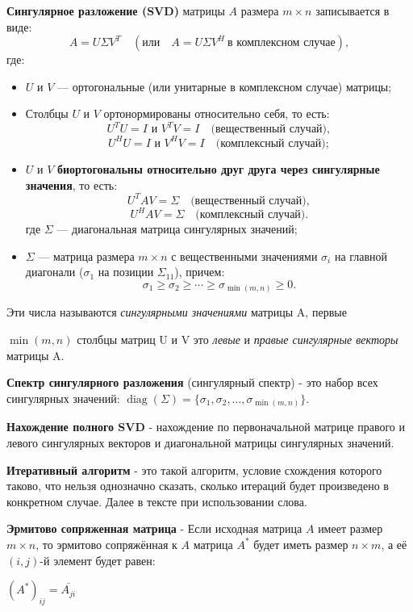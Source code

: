\hspace{0.45cm} \textbf{Сингулярное разложение (SVD)} матрицы \( A \) размера \( m \times n \) записывается в виде:
\[
A = U \Sigma V^T \quad (\text{или} \quad A = U \Sigma V^H \ \text{в комплексном случае}),
\]
где:
\begin{itemize}
    \item \( U \) и \( V \) — ортогональные (или унитарные в комплексном случае) матрицы;
    \item Столбцы \( U \) и \( V \) ортонормированы относительно себя, то есть:
    \[
    U^T U = I \text{ и } V^T V = I \quad \text{(вещественный случай)},
    \]
    \[
    U^H U = I \text{ и } V^H V = I \quad \text{(комплексный случай)};
    \]
    \item \( U \) и \( V \) \textbf{биортогональны относительно друг друга через сингулярные значения}, то есть:
    \[
    U^T A V = \Sigma \quad \text{(вещественный случай)},
    \]
    \[
    U^H A V = \Sigma \quad \text{(комплексный случай)}.
    \]
    где \( \Sigma \) — диагональная матрица сингулярных значений;
    \item \( \Sigma \) — матрица размера \( m \times n \) с вещественными значениями \( \sigma_i \) на главной диагонали (\( \sigma_1 \) на позиции \( \Sigma_{11} \)), причем:
    \[
    \sigma_1 \geq \sigma_2 \geq \cdots \geq \sigma_{\min(m, n)} \geq 0.
    \]
\end{itemize}

Эти числа называются \textit{сингулярными значениями} матрицы A, первые 

\(\min(m,n)\) столбцы матриц U и V это \textit{левые} и \textit{правые сингулярные векторы} матрицы A.

\textbf{Спектр сингулярного разложения} (сингулярный спектр) - это набор всех сингулярных значений: \( \operatorname{diag}(\Sigma) = \{ \sigma_1, \sigma_2, \dots, \sigma_{\min(m, n)} \} \).

\textbf{Нахождение полного SVD} - нахождение по первоначальной матрице правого и левого сингулярных векторов и диагональной матрицы сингулярных значений. 

\textbf{Итеративный алгоритм} - это такой алгоритм, условие схождения которого таково, что нельзя однозначно сказать, сколько итераций будет произведено в конкретном случае. Далее в тексте при использовании слова. 

\textbf{Эрмитово сопряженная матрица} - Если исходная матрица $A$  имеет размер $m \times n$, то эрмитово сопряжённая к $A$ матрица $A^*$ будет иметь размер $n \times m$, а её $(i, j)$-й элемент будет равен:
\begin{center}
$(A^*)_{ij} = \overline{A_{ji}}$
\end{center}

